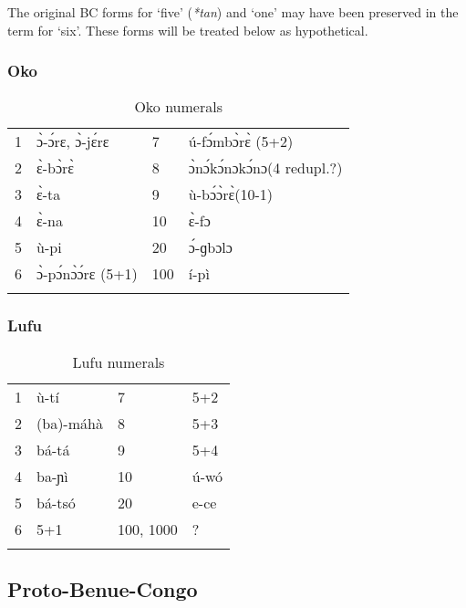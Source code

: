 The original BC forms for ‘five’ (\textit{*tan}) and ‘one’ may have been preserved in the term for ‘six’. These forms will be treated below as hypothetical.

\clearpage
\subsubsection{Oko}\label{sec:3.1.3.3}
\begin{table}
\caption{\label{tab:3:51}Oko numerals }


\begin{tabularx}{\textwidth}{lXXl}
\lsptoprule

{1} & {\`{ɔ}}-{\'{ɔ}}rɛ, {\`{ɔ}}-j{\'{ɛ}}rɛ & {7} & {\'{u}}-f{\'{ɔ}}mb{\`{ɔ}}r{\`{ɛ}} (5+2)\\
{2} & {\`{ɛ}}-b{\`{ɔ}}r{\`{ɛ}} & {8} & {\`{ɔ}}n{\'{ɔ}}k{\'{ɔ}}nɔk{\'{ɔ}}nɔ(4 redupl.?)\\
{3} & {\`{ɛ}}-ta & {9} & ù-b{\'{ɔ}}{\`{ɔ}}r{\`{ɛ}}(10-1)\\
{4} & {\`{ɛ}}-na & {10} & {\`{ɛ}}-fɔ\\
{5} & ù-pi & {20} & {\'{ɔ}}-ɡbɔlɔ\\
{6} & {\`{ɔ}}-p{\'{ɔ}}n{\`{ɔ}}{\'{ɔ}}rɛ (5+1) & {100} & í-pì\\
\lspbottomrule
\end{tabularx}
\end{table}

 
\subsubsection{Lufu}\label{sec:3.1.3.4}

\begin{table}
\caption{\label{tab:3:52}Lufu numerals}


\begin{tabularx}{\textwidth}{lXlX}
\lsptoprule

{1} & ù-tí & {7} & 5+2\\
{2} & (ba)-máhà & {8} & 5+3\\
{3} & bá-tá & {9} & 5+4\\
{4} & ba-ɲì & {10} & {\'{u}}-wó\\
{5} & bá-tsó & {20} & e-ce\\
{6} & 5+1 & {100,} {1000} & ? \\
\lspbottomrule
\end{tabularx}
\end{table}

\clearpage
\subsection{Proto-Benue-Congo}\label{sec:3.1.4}
